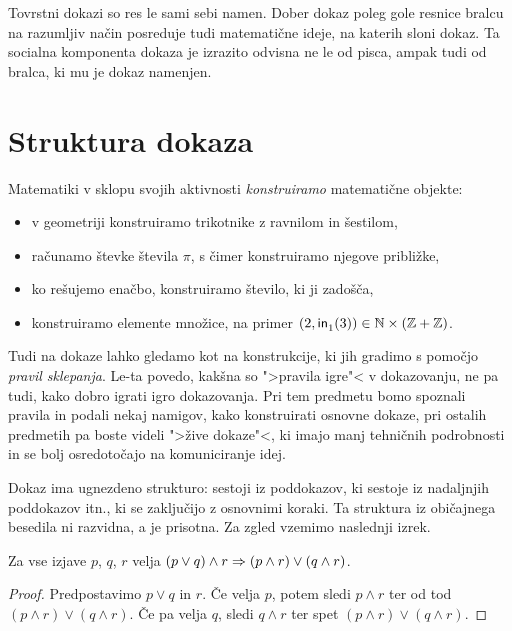 Tovrstni dokazi so res le sami sebi namen.
%
Dober dokaz poleg gole resnice bralcu na razumljiv način posreduje tudi matematične ideje, na katerih sloni dokaz.
%
Ta socialna komponenta dokaza je izrazito odvisna ne le od pisca, ampak tudi od bralca, ki mu je dokaz namenjen.
%



\section{Struktura dokaza}

Matematiki v sklopu svojih aktivnosti \emph{konstruiramo} matematične objekte:
%
\begin{itemize}
\item v geometriji konstruiramo trikotnike z ravnilom in šestilom,
\item računamo števke števila $\pi$, s čimer konstruiramo njegove približke,
\item ko rešujemo enačbo, konstruiramo število, ki ji zadošča,
\item konstruiramo elemente množice, na primer $(2, \inl(3)) \in \NN \times (\ZZ + \ZZ)$.
\end{itemize}
%
Tudi na dokaze lahko gledamo kot na konstrukcije, ki jih gradimo s pomočjo \emph{pravil sklepanja}.
%
Le-ta povedo, kakšna so ">pravila igre"< v dokazovanju, ne pa tudi, kako dobro igrati igro dokazovanja.
%
Pri tem predmetu bomo spoznali pravila in podali nekaj namigov, kako konstruirati osnovne dokaze, pri ostalih predmetih pa boste videli ">žive dokaze"<, ki imajo manj tehničnih podrobnosti in se bolj
osredotočajo na komuniciranje idej.

Dokaz ima ugnezdeno strukturo: sestoji iz poddokazov, ki sestoje iz nadaljnjih poddokazov itn., ki se zaključijo z osnovnimi koraki. Ta struktura iz običajnega besedila ni razvidna, a je prisotna. Za zgled vzemimo naslednji izrek.

\begin{izrek}
  \label{izrek:pqr}%
  Za vse izjave $p$, $q$, $r$ velja
  $(p \lor q) \land r \Rightarrow (p \land r) \lor (q \land r)$.
\end{izrek}

\begin{proof}
  Predpostavimo $p \lor q$ in $r$. Če velja $p$, potem sledi $p \land r$ ter od tod $(p \land r) \lor (q \land r)$. Če pa velja $q$, sledi $q \land r$ ter spet $(p \land r) \lor (q \land r)$.
\end{proof}

